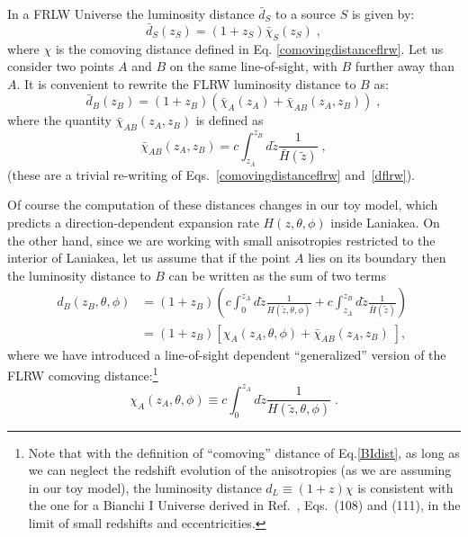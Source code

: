 \documentclass[notitlepage,nofootinbib]{revtex4-1}
\begin{document}
In a FRLW Universe the luminosity distance $\bar{d}_S$ to a source $S$ is given by:
\begin{equation}\label{dflrw}
    \bar{d}_S\left(z_S\right)=\left(1 + z_S\right)\bar{\chi}_S(z_S)\;,
\end{equation}
where $\chi$ is the comoving distance defined in Eq. \eqref{comovingdistanceflrw}.
Let us consider two points $A$ and $B$ on the same line-of-sight, with $B$ further away than $A$. It is convenient to rewrite the FLRW luminosity distance to $B$ as:
\begin{equation}
    \bar{d}_B(z_B)= \left(1+z_B\right)\left(\bar{\chi}_A(z_A) +\bar{\chi}_{AB}(z_A, z_B) \right)\;,
\end{equation}
where the quantity $\bar{\chi}_{AB}\left(z_A,z_B\right)$ is defined as
\begin{equation}
    \bar{\chi}_{AB}\left(z_A,z_B\right)= c\int_{z_A}^{z_B}d\tilde{z} \frac{1}{\bar{H}(\tilde{z})}\;,
\end{equation}
(these are a trivial re-writing of Eqs.~\ref{comovingdistanceflrw} and~\ref{dflrw}).

Of course the computation of these distances changes in our toy model, which predicts a direction-dependent expansion rate $H(z,\theta,\phi)$ inside Laniakea. On the other hand, since we are working with small anisotropies restricted to the interior of Laniakea, let us assume that if the point $A$ lies on its boundary then the luminosity distance to $B$ can be written as the sum of two terms
\begin{equation}\label{dlan}
\begin{split}
    d_B\left(z_B,\theta,\phi\right)&= \left(1+z_B\right)\left(c\int_{0}^{z_A}d\tilde{z}\frac{1}{H\left(\tilde{z},\theta,\phi\right) }+c\int_{z_A}^{z_B}d\tilde{z}\frac{1}{\bar{H}\left(\tilde{z}\right) }\right)\; \\
    &=\left(1+z_B\right)\left[\chi_A(z_A,\theta,\phi) + \bar{\chi}_{AB}\left(z_A,z_B\right) \;\right],
\end{split}
\end{equation}
where we have introduced a line-of-sight dependent ``generalized'' version of the FLRW comoving distance:\footnote{Note that with the definition of ``comoving'' distance of Eq.\eqref{BIdist}, as long as we can neglect the redshift evolution of the anisotropies (as we are assuming in our toy model), the luminosity distance 
 $d_L \equiv (1+z)\chi$ is consistent with the one for a Bianchi I Universe derived in Ref.~\cite{Schucker:2014wca}, Eqs.~(108) and (111), in the limit of small redshifts and eccentricities.}
\begin{equation}\label{BIdist}
    \chi_A(z_A,\theta,\phi) \equiv c\int_{0}^{z_A}d\tilde{z}\frac{1}{H\left(\tilde{z},\theta,\phi\right) }\;.
\end{equation}
\end{document}
